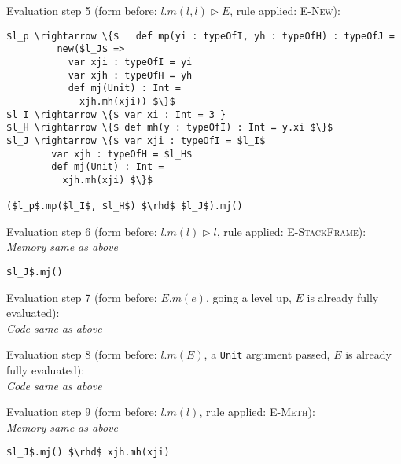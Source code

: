 \documentclass{llncs}
\begin{document}
\vspace{12pt}
\noindent Evaluation step 5 (form before: $l.m(l, l) \rhd E$, rule applied: \textsc{E-New}):
\vspace{-6pt}
\begin{lstlisting}[xleftmargin=20pt]
$l_p \rightarrow \{$   def mp(yi : typeOfI, yh : typeOfH) : typeOfJ =
         new($l_J$ =>
           var xji : typeOfI = yi
           var xjh : typeOfH = yh
           def mj(Unit) : Int =
             xjh.mh(xji)) $\}$
$l_I \rightarrow \{$ var xi : Int = 3 }
$l_H \rightarrow \{$ def mh(y : typeOfI) : Int = y.xi $\}$
$l_J \rightarrow \{$ var xji : typeOfI = $l_I$
        var xjh : typeOfH = $l_H$
        def mj(Unit) : Int =
          xjh.mh(xji) $\}$

($l_p$.mp($l_I$, $l_H$) $\rhd$ $l_J$).mj()
\end{lstlisting}

\vspace{12pt}
\noindent Evaluation step 6 (form before: $l.m(l) \rhd l$, rule applied: \textsc{E-StackFrame}):\\
\vspace{-6pt}
\indent\textit{Memory same as above}\\
\vspace{-6pt}
\begin{lstlisting}[xleftmargin=20pt]
$l_J$.mj()
\end{lstlisting}

\vspace{12pt}
\noindent Evaluation step 7 (form before: $E.m(e)$, going a level up, $E$ is already fully evaluated):\\
\indent\textit{Code same as above}

\vspace{12pt}
\noindent Evaluation step 8 (form before: $l.m(E)$, a \lstinline{Unit} argument passed, $E$ is already fully evaluated):\\
\indent\textit{Code same as above}

\vspace{12pt}
\noindent Evaluation step 9 (form before: $l.m(l)$, rule applied: \textsc{E-Meth}):\\
\vspace{-6pt}
\indent\textit{Memory same as above}\\
\vspace{-6pt}
\begin{lstlisting}[xleftmargin=20pt]
$l_J$.mj() $\rhd$ xjh.mh(xji)
\end{lstlisting}
\end{document}
